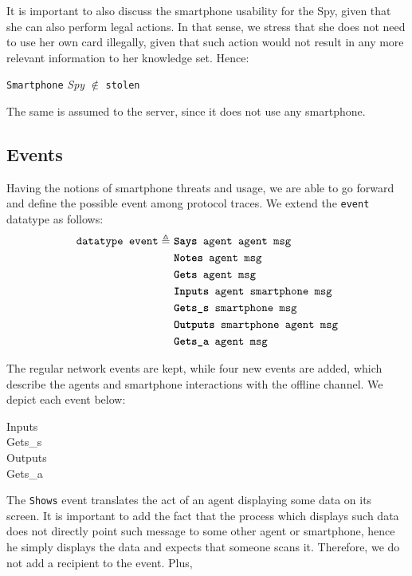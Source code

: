It is important to also discuss the smartphone usability for the Spy, given that she can also perform legal actions. In that sense, we stress that she does not need to use her own card illegally, given that such action would not result in any more relevant information to her knowledge set. Hence:
%
\begin{center}
  \texttt{Smartphone} \textit{Spy} $\notin$ \texttt{stolen}
\end{center}
%
The same is assumed to the server, since it does not use any smartphone.



\subsection{Events}
Having the notions of smartphone threats and usage, we are able to go forward and define the possible event among protocol traces. We extend the \texttt{event} datatype as follows:
%
\begin{equation*}
  \begin{split}
    \texttt{datatype event} \triangleq \
    & \texttt{\textbf{Says} agent agent msg} \\
    & \texttt{\textbf{Notes} agent msg} \\
    & \texttt{\textbf{Gets} agent msg} \\
    & \texttt{\textbf{Inputs} agent smartphone msg} \\
    & \texttt{\textbf{Gets\_s} smartphone msg} \\
    & \texttt{\textbf{Outputs} smartphone agent msg} \\
    & \texttt{\textbf{Gets\_a} agent msg}
  \end{split}
\end{equation*}

The regular network events are kept, while four new events are added, which describe the agents and smartphone interactions with the offline channel. We depict each event below:

\begin{description}
  \item[Inputs]

  \item[Gets\_s]

  \item[Outputs]

  \item[Gets\_a]
\end{description}

The \texttt{Shows} event translates the act of an agent displaying some data on its screen. It is important to add the fact that the process which displays such data does not directly point such message to some other agent or smartphone, hence he simply displays the data and expects that someone scans it. Therefore, we do not add a recipient to the event. Plus,

